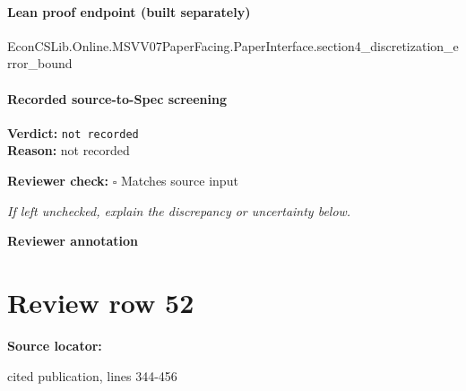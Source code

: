 \documentclass[10pt]{article}
\newcommand{\reviewerbox}{%
  \par\noindent\fbox{\parbox{0.96\linewidth}{\rule{0pt}{0.38in}}}\par
}
\newcommand{\reviewmatch}[1]{%
  \par\noindent\textbf{Reviewer check:} $\square$\; #1\par
  \noindent\emph{If left unchecked, explain the discrepancy or uncertainty below.}\par
}
\begin{document}
\paragraph{Lean proof endpoint (built separately)}\begin{ReviewVerbatim}
EconCSLib.Online.MSVV07PaperFacing.PaperInterface.section4_discretization_error_bound
\end{ReviewVerbatim}

\paragraph{Recorded source-to-Spec screening}
\textbf{Verdict:} \texttt{not recorded}
\\
\textbf{Reason:} not recorded
\reviewmatch{Matches source input}
\noindent\textbf{Reviewer annotation}\par
\reviewerbox
\clearpage
\hypertarget{source-claim-fbfc9585e50c9fbc}{}
\section*{Review row 52}
\textbf{Source locator:} {\footnotesize\raggedright cited publication, lines 344-\allowbreak{}456\par}
\end{document}
